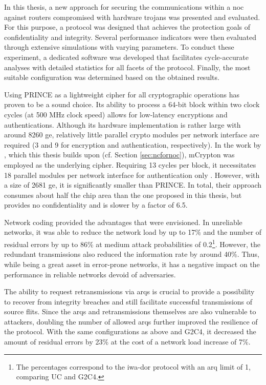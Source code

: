 In this thesis, a new approach for securing the communications within a \gls{noc} against routers compromised with hardware trojans was presented
and evaluated. For this purpose, a protocol was designed that achieves the protection goals of confidentiality and integrity. Several performance indicators were then
evaluated through extensive simulations with varying parameters. To conduct these experiment, a dedicated software was developed that facilitates
cycle-accurate analyses with detailed statistics for all facets of the protocol. Finally, the most suitable configuration was determined based on the
obtained results.

Using PRINCE as a lightweight cipher for all cryptographic operations has proven to be a sound choice. Its ability to process a 64-bit block within two
clock cycles (at 500 MHz clock speed) allows for low-latency encryptions and authentications. Although its hardware implementation is
rather large with around 8260 \gls{ge}, relatively little parallel crypto modules per network interface are required (3 and 9 for encryption and
authentication, respectively). In the work by \citeauthor{moriam18activeattackers}, which this thesis builds upon (cf. Section \ref{sec:ncfornoc}),
mCrypton \cite{lim06mcrypton} was employed as the underlying cipher. Requiring 13 cycles per block, it necessitates 18 parallel modules per network
interface for authentication only \cite[5]{moriam18activeattackers}. However, with a size of 2681 \gls{ge}, it is significantly smaller than PRINCE.
In total, their approach consumes about half the chip area than the one proposed in this thesis, but provides no confidentiality and is slower by a
factor of 6.5.

Network coding provided the advantages that were envisioned. In unreliable networks, it was able to reduce the network load by up to 17\% and the
number of residual errors by up to 86\% at medium attack probabilities of 0.2\footnote{The percentages correspond to the \gls{iwa}-\gls{dor} protocol
with an \gls{arq} limit of 1, comparing UC and G2C4.}. However, the redundant transmissions also reduced the information rate by around 40\%. Thus,
while being a great asset in error-prone networks, it has a negative impact on the performance in reliable networks devoid of adversaries.

The ability to request retransmissions via \glspl{arq} is crucial to provide a possibility to recover from integrity breaches and still facilitate
successful transmissions of source flits. Since the \glspl{arq} and retransmissions themselves are also vulnerable to attackers, doubling
the number of allowed \glspl{arq} further improved the resilience of the protocol. With the same configurations as above and G2C4, it decreased the
amount of residual errors by 23\% at the cost of a network load increase of 7\%.

